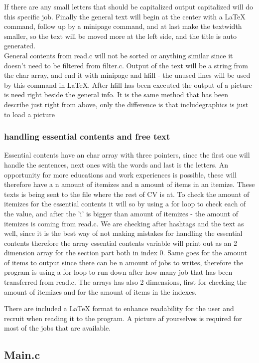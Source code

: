 If there are any small letters that should be capitalized output capitalized will do this specific job.
Finally the general text will begin at the center with a LaTeX command, follow up by a minipage command, 
and at last make the textwidth smaller, so the text will be moved more at the left side, and the title is auto generated. \\

General contents from read.c will not be sorted or anything similar 
since it doesn't need to be filtered from filter.c.
Output of the text will be a string from the char array, and end it with minipage and hfill - the unused lines will be used by this command in LaTeX.
After hfill has been executed the output of a picture is need right beside the general info.
It is the same method that has been describe just right from above, only the difference is that includegraphics is just to load a picture 

\subsubsection{handling essential contents and free text}
Essential contents have an char array with three pointers, since the first one will handle the sentences,
next ones with the words and last is the letters. An opportunity for more educations and work experiences is possible,
these will therefore have a n amount of itemizes and n amount of items in an itemize. 
These texts is being sent to the file where the rest of CV is at.
To check the amount of itemizes for the essential contents it will so by using a for loop to check each of the value,
and after the 'i' is bigger than amount of itemizes - the amount of itemizes is coming from read.c.
We are checking after hashtags and the text as well, since it is the best way of not making mistakes for handling the essential contents
therefore the array essential contents variable will print out as an 2 dimension array for the section part both in index 0.
Same goes for the amount of items to output since there can be n amount of jobs to writes, 
therefore the program is using a for loop to run down after how many job that has been transferred from read.c.
The arrays has also 2 dimensions, first for checking the amount of itemizes and for the amount of items in the indexes.


There are included a LaTeX format to enhance readability for the user and recruit when reading it
to the program. A picture af yourselves is required for most of the jobs that are available.
\subsection{Main.c}
